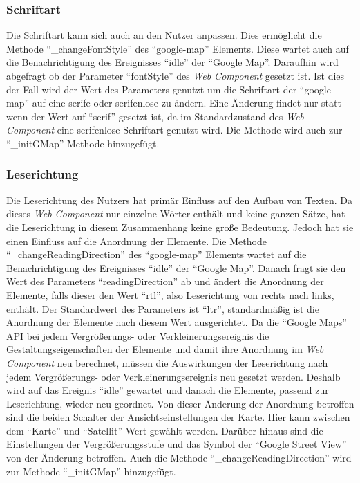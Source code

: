 \documentclass[12pt, paper=a4, bibtotoc, toc=listof, headsepline=true]{scrreprt}
\begin{document}
	\subsubsection{Schriftart}
	Die Schriftart kann sich auch an den Nutzer anpassen. Dies ermöglicht die Methode \enquote{\_changeFontStyle} des \enquote{google-map} Elements. Diese wartet auch auf die Benachrichtigung des Ereignisses \enquote{idle} der \enquote{Google Map}. Daraufhin wird abgefragt ob der Parameter \enquote{fontStyle} des \emph{Web Component} gesetzt ist. Ist dies der Fall wird der Wert des Parameters genutzt um die Schriftart der \enquote{google-map} auf eine serife oder serifenlose zu ändern. Eine Änderung findet nur statt wenn der Wert auf \enquote{serif} gesetzt ist, da im Standardzustand des \emph{Web Component} eine serifenlose Schriftart genutzt wird. Die Methode wird auch zur \enquote{\_initGMap} Methode hinzugefügt.
	\subsubsection{Leserichtung}
	Die Leserichtung des Nutzers hat primär Einfluss auf den Aufbau von Texten. Da dieses \emph{Web Component} nur einzelne Wörter enthält und keine ganzen Sätze, hat die Leserichtung in diesem Zusammenhang keine große Bedeutung. Jedoch hat sie einen Einfluss auf die Anordnung der Elemente. Die Methode \enquote{\_changeReadingDirection} des \enquote{google-map} Elements wartet auf die Benachrichtigung des Ereignisses \enquote{idle} der \enquote{Google Map}. Danach fragt sie den Wert des Parameters \enquote{readingDirection} ab und ändert die Anordnung der Elemente, falls dieser den Wert \enquote{rtl}, also Leserichtung von rechts nach links, enthält. Der Standardwert des Parameters ist \enquote{ltr}, standardmäßig ist die Anordnung der Elemente nach diesem Wert ausgerichtet. Da die \enquote{Google Maps} \ac{API} bei jedem Vergrößerungs- oder Verkleinerungsereignis die Gestaltungseigenschaften der Elemente und damit ihre Anordnung im \emph{Web Component} neu berechnet, müssen die Auswirkungen der Leserichtung nach jedem Vergrößerungs- oder Verkleinerungsereignis neu gesetzt werden. Deshalb wird auf das Ereignis \enquote{idle} gewartet und danach die Elemente, passend zur Leserichtung, wieder neu geordnet. Von dieser Änderung der Anordnung betroffen sind die beiden Schalter der Ansichtseinstellungen der Karte. Hier kann zwischen dem \enquote{Karte} und \enquote{Satellit} Wert gewählt werden. Darüber hinaus sind die Einstellungen der Vergrößerungsstufe und das Symbol der \enquote{Google Street View} von der Änderung betroffen. Auch die Methode \enquote{\_changeReadingDirection} wird zur Methode \enquote{\_initGMap} hinzugefügt.
	\newpage
\end{document}
